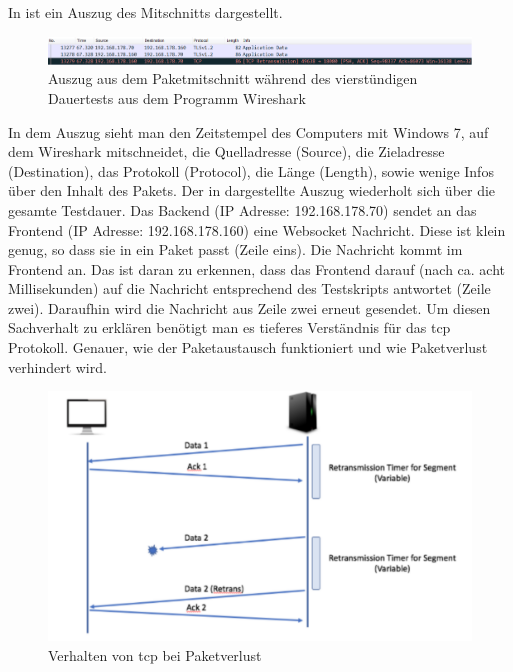 In  ist ein Auszug des Mitschnitts dargestellt.
\begin{figure}[ht]
  \centering
  \includegraphics[width=\textwidth]{content/hauptteil/umsetzungPoC/pocTest/res/LatenzNormal4hWireshark.pdf}
  \caption[Auszug aus dem Paketmitschnitt während des vierstündigen Dauertests aus dem Programm \mbox{Wireshark}]{Auszug aus dem Paketmitschnitt während des vierstündigen Dauertests aus dem Programm \mbox{Wireshark \citep{wireshark:program}} }
  \label{fig:testing:latency4hNorm:wireshark}
\end{figure}
In dem Auszug sieht man den Zeitstempel des Computers mit Windows 7, auf dem Wireshark mitschneidet, die Quelladresse (Source), die Zieladresse (Destination), das Protokoll (Protocol), die Länge (Length), sowie wenige Infos über den Inhalt des Pakets.
Der in  dargestellte Auszug wiederholt sich über die gesamte Testdauer.
Das Backend (IP Adresse: 192.168.178.70) sendet an das Frontend (IP Adresse: 192.168.178.160) eine Websocket Nachricht. 
Diese ist klein genug, so dass sie in ein Paket passt (Zeile eins).
Die Nachricht kommt im Frontend an. Das ist daran zu erkennen, dass das Frontend darauf (nach ca. acht Millisekunden) auf die Nachricht entsprechend des Testskripts antwortet (Zeile zwei).
Daraufhin wird die Nachricht aus Zeile zwei erneut gesendet.
Um diesen Sachverhalt zu erklären benötigt man es tieferes Verständnis für das \ac{tcp} Protokoll. Genauer, wie der Paketaustausch funktioniert und wie Paketverlust verhindert wird.
\begin{figure}[ht]
  \centering
  \includegraphics[width=\textwidth]{content/hauptteil/umsetzungPoC/pocTest/res/tcpPackageLostGraph.pdf}
  \caption[Verhalten von \ac{tcp} bei Paketverlust]{Verhalten von \ac{tcp} bei Paketverlust \citep{tcp:articel}}
  \label{fig:testing:tcp:retrans}
\end{figure}
